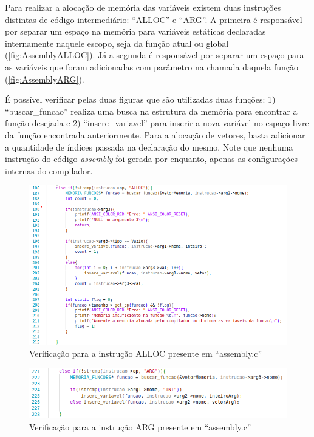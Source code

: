 \documentclass[
	12pt,				%
	oneside,
	a4paper,			%
	english,			%
	french,				%
	spanish,			%
	brazil,				%
	]{abntex2}
\begin{document}
Para realizar a alocação de memória das variáveis existem duas instruções distintas de código intermediário: ``ALLOC'' e ``ARG''. A primeira é responsável por separar um espaço na memória para variáveis estáticas declaradas internamente naquele escopo, seja da função atual ou global (\autoref{fig:AssemblyALLOC}). Já a segunda é responsável por separar um espaço para as variáveis que foram adicionadas com parâmetro na chamada daquela função (\autoref{fig:AssemblyARG}). 

É possível verificar pelas duas figuras que são utilizadas duas funções: 1) \nohyphens{``buscar\_funcao''} realiza uma busca na estrutura da memória para encontrar a função desejada e 2) ``insere\_variavel'' para inserir a nova variável no espaço livre da função encontrada anteriormente. Para a alocação de vetores, basta adicionar a quantidade de índices passada na declaração do mesmo. Note que nenhuma instrução do código \emph{assembly} foi gerada por enquanto, apenas as configurações internas do compilador.

\begin{figure}[htbp]
\centering 
\caption{Verificação para a instrução ALLOC presente em \nohyphens{``assembly.c''}} 
\label{fig:AssemblyALLOC}
\graphicspath{ {./imgs/} } 
\includegraphics[scale=0.5]{imgs/Codigo/Assembly_ALLOC.png}
\end{figure}


\begin{figure}[htbp]
\centering 
\caption{Verificação para a instrução ARG presente em \nohyphens{``assembly.c''}} 
\label{fig:AssemblyARG}
\graphicspath{ {./imgs/} } 
\includegraphics[scale=0.5]{imgs/Codigo/Assembly_ARG.png}
\end{figure}
\end{document}

